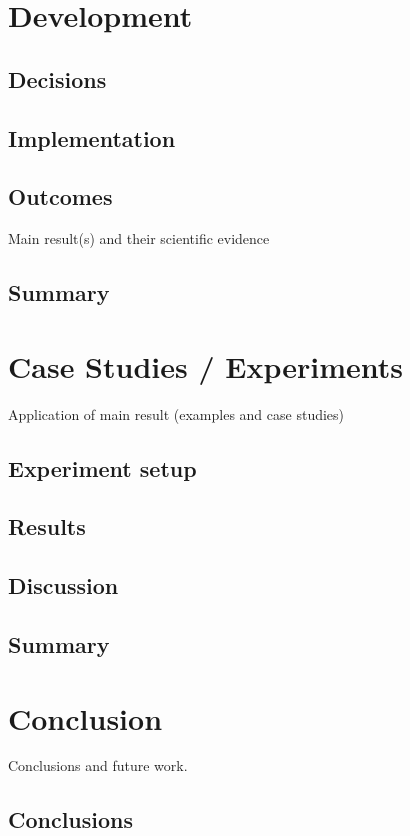 \documentclass[a4paper]{report}
\begin{document}
	\chapter{Development}
		
	\section{Decisions}
    \section{Implementation}
    \section{Outcomes}
    Main result(s) and their scientific evidence
	\section{Summary}

	\chapter{Case Studies / Experiments}
		Application of main result (examples and case studies)
	\section{Experiment setup}
    \section{Results}
    \section{Discussion}
	\section{Summary}

	\chapter{Conclusion}
		Conclusions and future work.
	\section{Conclusions}
\end{document}
